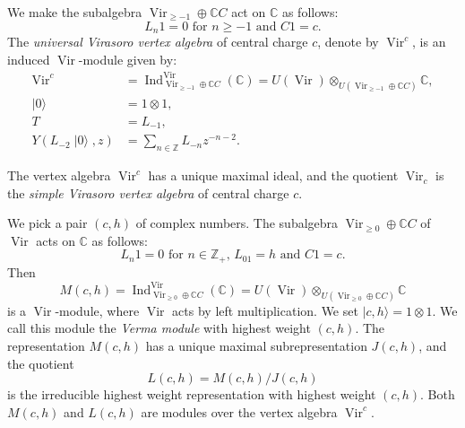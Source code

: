 \documentclass{beamer}
\DeclareMathOperator{\Vir}{Vir}
\DeclareMathOperator{\Ind}{Ind}
\DeclareMathOperator{\vac}{|0\rangle}
\begin{document}
\begin{frame}

  \begin{example}
    \label{exa:3}
    We make the subalgebra $\Vir_{\ge -1} \oplus \mathbb{C}C$ act on $\mathbb{C}$ as follows:
    \begin{equation*}
      \text{$L_n1 = 0$ for $n \ge -1$ and $C1 = c$}.
    \end{equation*}
    The \emph{universal Virasoro vertex algebra} of central charge $c$, denote by $\Vir^c$, is an induced $\Vir$-module given by:
    \begin{align*}
      \Vir^c &= \Ind^{\Vir}_{\Vir_{\ge -1} \oplus \mathbb{C}C}(\mathbb{C}) = U(\Vir) \otimes_{U(\Vir_{\ge -1} \oplus \mathbb{C}C)} \mathbb{C}, \\
      \vac &= 1\otimes 1, \\
      T & = L_{-1}, \\
      Y(L_{-2}\vac, z) &= \sum_{n \in \mathbb{Z}}L_{-n}z^{-n - 2}.
    \end{align*}

    The vertex algebra $\Vir^c$ has a unique maximal ideal, and the quotient $\Vir_c$ is the \emph{simple Virasoro vertex algebra} of central charge $c$.
  \end{example}

\end{frame}

\begin{frame}

  \begin{example}
    \label{exa:4}
    We pick a pair $(c, h)$ of complex numbers.
    The subalgebra $\Vir_{\ge 0} \oplus \mathbb{C}C$ of $\Vir$ acts on $\mathbb{C}$ as follows:
    \begin{equation*}
      \text{$L_n1 = 0$ for $n \in \mathbb{Z}_+$, $L_01 = h$ and $C1 = c$}.
    \end{equation*}
    Then
    \begin{equation*}
      M(c, h) = \Ind^{\Vir}_{\Vir_{\ge 0} \oplus \mathbb{C}C}(\mathbb{C}) = U(\Vir) \otimes_{U(\Vir_{\ge 0} \oplus \mathbb{C}C)} \mathbb{C}
    \end{equation*}
    is a $\Vir$-module, where $\Vir$ acts by left multiplication.
    We set $|c, h\rangle = 1\otimes1$.
    We call this module the \emph{Verma module} with highest weight $(c, h)$.
    The representation $M(c, h)$ has a unique maximal subrepresentation $J(c, h)$, and the quotient
    \begin{equation*}
      L(c, h) = M(c, h)/J(c, h)
    \end{equation*}
    is the irreducible highest weight representation with highest weight $(c, h)$.
    Both $M(c, h)$ and $L(c, h)$ are modules over the vertex algebra $\Vir^c$.
  \end{example}

\end{frame}
\end{document}
